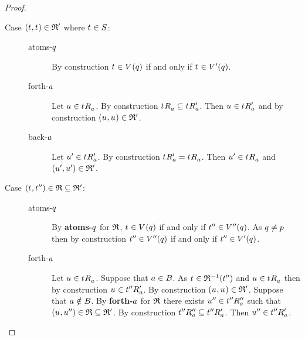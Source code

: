 \begin{proof}
\begin{description}
    \item[Case $(\kStateT, \kStateT) \in \bisimulation'$ where $\kStateT \in \kStates$:]
        \hfill
        \begin{description}
            \item[atoms-$q$] 
                By construction $\kStateT \in \kValuation(\atomQ)$ if and only if $\kStateT \in \kValuationP(\atomQ)$.
            \item[forth-$a$]
                Let $\kStateU \in \kSuccessorsA{\kStateT}$.
                By construction $\kSuccessorsA{\kStateT} \subseteq \kSuccessorsPA{\kStateT}$.
                Then $\kStateU \in \kSuccessorsPA{\kStateT}$ and by construction $(\kStateU, \kStateU) \in \bisimulation'$.
            \item[back-$a$]
                Let $\kStateUP \in \kSuccessorsPA{\kStateT}$.
                By construction $\kSuccessorsPA{\kStateT} = \kSuccessorsA{\kStateT}$.
                Then $\kStateUP \in \kSuccessorsA{\kStateT}$ and $({u}^{\prime}, {u}^{\prime}) \in \mathfrak{R}'$.
        \end{description}
    \item[Case $(\kStateT, \kStateTPP) \in \refinement \subseteq \bisimulation'$:]
        \hfill
        \begin{description}
            \item[atoms-$q$] 
                By {\bf atoms-$q$} for $\mathfrak{R}$, $\kStateT \in \kValuation(\atomQ)$ if and only if ${t}^{\prime\prime} \in {V^{\prime\prime}}(q)$.
                As $q \neq p$ then by construction ${t}^{\prime\prime} \in {V^{\prime\prime}}(q)$ if and only if ${t}^{\prime\prime} \in {V^{\prime}}(q)$.
            \item[forth-$a$]
                Let $\kStateU \in \kSuccessorsA{\kStateT}$.
                Suppose that $a \in B$.
                As $\kStateT \in \refinement^{-1}(\kStateTPP)$ and $\kStateU \in \kSuccessorsA{\kStateT}$ then by construction $\kStateU \in \kSuccessorsPA{\kStateTPP}$.
                By construction $(\kStateU, \kStateU) \in \bisimulation'$.
                Suppose that $a \notin B$.
                By {\bf forth-$a$} for $\mathfrak{R}$ there exists ${u}^{\prime\prime} \in {{t}^{\prime\prime}} {R^{\prime\prime}_{a}}$ such that $(\kStateU, \kStateUPP) \in \refinement \subseteq \bisimulation'$.
                By construction ${{t}^{\prime\prime}} {R^{\prime\prime}_{a}} \subseteq {{t}^{\prime\prime}} {R^{\prime}_{a}}$.
                Then ${u}^{\prime\prime} \in {{t}^{\prime\prime}} {R^{\prime}_{a}}$.

\end{description}
\end{description}
\end{proof}
